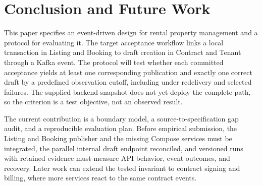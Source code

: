 \section{Conclusion and Future Work}\label{sec:conclusion}

This paper specifies an event-driven design for rental property management and a protocol for evaluating it. The target acceptance workflow links a local transaction in Listing and Booking to draft creation in Contract and Tenant through a Kafka event. The protocol will test whether each committed acceptance yields at least one corresponding publication and exactly one correct draft by a predefined observation cutoff, including under redelivery and selected failures. The supplied backend snapshot does not yet deploy the complete path, so the criterion is a test objective, not an observed result.

The current contribution is a boundary model, a source-to-specification gap audit, and a reproducible evaluation plan. Before empirical submission, the Listing and Booking publisher and the missing Compose services must be integrated, the parallel internal draft endpoint reconciled, and versioned runs with retained evidence must measure API behavior, event outcomes, and recovery. Later work can extend the tested invariant to contract signing and billing, where more services react to the same contract events.
